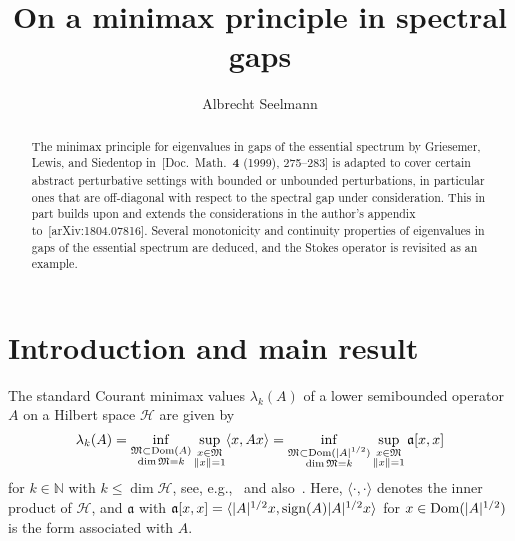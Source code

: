 \documentclass[11pt,a4paper]{amsart}
\title[On a minimax principle in spectral gaps]{On a minimax principle in spectral gaps}
\date{}
\author[A.\ Seelmann]{Albrecht Seelmann}
\numberwithin{equation}{section}
\DeclareMathOperator{\Dom}{Dom}
\DeclareMathOperator{\sign}{sign}
\DeclarePairedDelimiter{\abs}{|}{|}
\DeclarePairedDelimiter{\norm}{\lVert}{\rVert}
\DeclarePairedDelimiter{\scprod}{\langle}{\rangle}
\newcommand{\N}{\mathbb{N}}
\newcommand{\cH}{{\mathcal H}}
\newcommand{\fa}{{\mathfrak a}}
\newcommand{\fM}{{\mathfrak M}}
\theoremstyle{plain}
\theoremstyle{definition}
\theoremstyle{remark}
\begin{document}
\begin{abstract}
  The minimax principle for eigenvalues in gaps of the essential spectrum by Griesemer, Lewis, and Siedentop
  in~[Doc.~Math.~\textbf{4} (1999), 275--283] is adapted to cover certain abstract perturbative settings with bounded or
  unbounded perturbations, in particular ones that are off-diagonal with respect to the spectral gap under consideration. This in
  part builds upon and extends the considerations in the author's appendix to~[arXiv:1804.07816]. Several monotonicity and
  continuity properties of eigenvalues in gaps of the essential spectrum are deduced, and the Stokes operator is revisited as an
  example.
\end{abstract}

\maketitle

\section{Introduction and main result}\label{sec:intro}

The standard Courant minimax values $\lambda_k(A)$ of a lower semibounded operator $A$ on a Hilbert space $\cH$ are given by
\begin{equation*}
  \lambda_k(A)
  =
  \inf_{\substack{\fM\subset\Dom(A)\\ \dim\fM=k}} \sup_{\substack{x\in\fM\\ \norm{x}=1}} \scprod{ x , Ax }
  =
  \inf_{\substack{\fM\subset\Dom(|A|^{1/2})\\ \dim\fM=k}} \sup_{\substack{x\in\fM\\ \norm{x}=1}} \fa[x,x]
\end{equation*}
for $k\in\N$ with $k\le\dim\cH$, see, e.g.,~\cite[Theorem~12.1]{LL01} and also~\cite[Section~12.1 and Exercise~12.4.2]{Schm12}.
Here, $\langle\cdot,\cdot\rangle$ denotes the inner product of $\cH$, and $\fa$ with
$\fa[x,x] = \scprod{ \abs{A}^{1/2}x , \sign(A)\abs{A}^{1/2}x }$ for $x\in\Dom(\abs{A}^{1/2})$ is the form associated with $A$.
\end{document}
